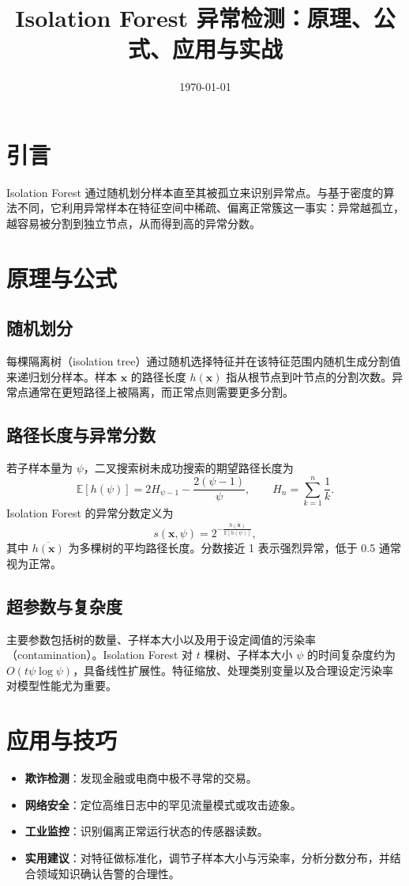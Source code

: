 \documentclass[UTF8,zihao=-4]{ctexart}
\title{Isolation Forest 异常检测：原理、公式、应用与实战}
\author{}
\date{\today}
\begin{document}
\maketitle

\section{引言}
Isolation Forest 通过随机划分样本直至其被孤立来识别异常点。与基于密度的算法不同，它利用异常样本在特征空间中稀疏、偏离正常簇这一事实：异常越孤立，越容易被分割到独立节点，从而得到高的异常分数。

\section{原理与公式}
\subsection{随机划分}
每棵隔离树（isolation tree）通过随机选择特征并在该特征范围内随机生成分割值来递归划分样本。样本 \(\mathbf{x}\) 的路径长度 \(h(\mathbf{x})\) 指从根节点到叶节点的分割次数。异常点通常在更短路径上被隔离，而正常点则需要更多分割。

\subsection{路径长度与异常分数}
若子样本量为 \(\psi\)，二叉搜索树未成功搜索的期望路径长度为
\begin{equation}
\mathbb{E}[h(\psi)] = 2 H_{\psi-1} - \frac{2(\psi-1)}{\psi}, \qquad H_n = \sum_{k=1}^n \frac{1}{k}.
\end{equation}
Isolation Forest 的异常分数定义为
\begin{equation}
s(\mathbf{x}, \psi) = 2^{-\frac{\overline{h(\mathbf{x})}}{\mathbb{E}[h(\psi)]}},
\end{equation}
其中 \(\overline{h(\mathbf{x})}\) 为多棵树的平均路径长度。分数接近 1 表示强烈异常，低于 0.5 通常视为正常。

\subsection{超参数与复杂度}
主要参数包括树的数量、子样本大小以及用于设定阈值的污染率（contamination）。Isolation Forest 对 \(t\) 棵树、子样本大小 \(\psi\) 的时间复杂度约为 \(O(t \psi \log \psi)\)，具备线性扩展性。特征缩放、处理类别变量以及合理设定污染率对模型性能尤为重要。

\section{应用与技巧}
\begin{itemize}
  \item \textbf{欺诈检测}：发现金融或电商中极不寻常的交易。
  \item \textbf{网络安全}：定位高维日志中的罕见流量模式或攻击迹象。
  \item \textbf{工业监控}：识别偏离正常运行状态的传感器读数。
  \item \textbf{实用建议}：对特征做标准化，调节子样本大小与污染率，分析分数分布，并结合领域知识确认告警的合理性。
\end{itemize}
\end{document}
